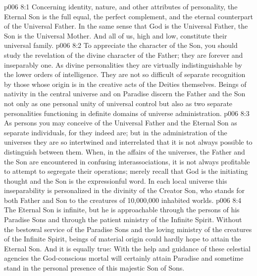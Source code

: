 \vs p006 8:1 Concerning identity, nature, and other attributes of personality, the Eternal Son is the full equal, the perfect complement, and the eternal counterpart of the Universal Father. In the same sense that God is the Universal Father, the Son is the Universal Mother. And all of us, high and low, constitute their universal family.
\vs p006 8:2 To appreciate the character of the Son, you should study the revelation of the divine character of the Father; they are forever and inseparably one. As divine personalities they are virtually indistinguishable by the lower orders of intelligence. They are not so difficult of separate recognition by those whose origin is in the creative acts of the Deities themselves. Beings of nativity in the central universe and on Paradise discern the Father and the Son not only as one personal unity of universal control but also as two separate personalities functioning in definite domains of universe administration.
\vs p006 8:3 As persons you may conceive of the Universal Father and the Eternal Son as separate individuals, for they indeed are; but in the administration of the universes they are so intertwined and interrelated that it is not always possible to distinguish between them. When, in the affairs of the universes, the Father and the Son are encountered in confusing interassociations, it is not always profitable to attempt to segregate their operations; merely recall that God is the initiating thought and the Son is the expressionful word. In each local universe this inseparability is personalized in the divinity of the Creator Son, who stands for both Father and Son to the creatures of 10,000,000 inhabited worlds.
\vs p006 8:4 The Eternal Son is infinite, but he is approachable through the persons of his Paradise Sons and through the patient ministry of the Infinite Spirit. Without the bestowal service of the Paradise Sons and the loving ministry of the creatures of the Infinite Spirit, beings of material origin could hardly hope to attain the Eternal Son. And it is equally true: With the help and guidance of these celestial agencies the God\hyp{}conscious mortal will certainly attain Paradise and sometime stand in the personal presence of this majestic Son of Sons.

